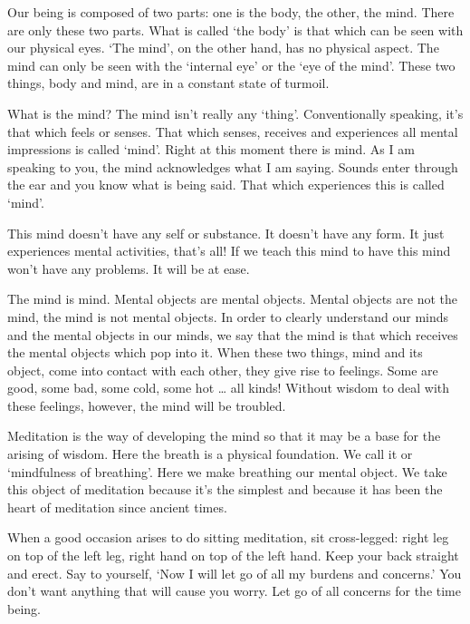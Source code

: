  Our being is composed of two parts: one is the body, the other, the mind. There are only these two parts. What is called `the body' is that which can be seen with our physical eyes. `The mind', on the other hand, has no physical aspect. The mind can only be seen with the `internal eye' or the `eye of the mind'. These two things, body and mind, are in a constant state of turmoil. 

 What is the mind? The mind isn't really any `thing'. Conventionally speaking, it's that which feels or senses. That which senses, receives and experiences all mental impressions is called `mind'. Right at this moment there is mind. As I am speaking to you, the mind acknowledges what I am saying. Sounds enter through the ear and you know what is being said. That which experiences this is called `mind'. 

 This mind doesn't have any self or substance. It doesn't have any form. It just experiences mental activities, that's all! If we teach this mind to have  this mind won't have any problems. It will be at ease. 

 The mind is mind. Mental objects are mental objects. Mental objects are not the mind, the mind is not mental objects. In order to clearly understand our minds and the mental objects in our minds, we say that the mind is that which receives the mental objects which pop into it. When these two things, mind and its object, come into contact with each other, they give rise to feelings. Some are good, some bad, some cold, some hot \ldots{} all kinds! Without wisdom to deal with these feelings, however, the mind will be troubled. 

 Meditation is the way of developing the mind so that it may be a base for the arising of wisdom. Here the breath is a physical foundation. We call it  or `mindfulness of breathing'. Here we make breathing our mental object. We take this object of meditation because it's the simplest and because it has been the heart of meditation since ancient times. 

 When a good occasion arises to do sitting meditation, sit cross-legged: right leg on top of the left leg, right hand on top of the left hand. Keep your back straight and erect. Say to yourself, `Now I will let go of all my burdens and concerns.' You don't want anything that will cause you worry. Let go of all concerns for the time being. 

